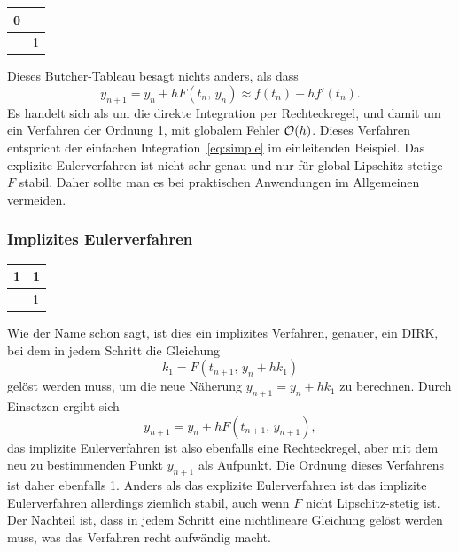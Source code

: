 \begin{center}
  \renewcommand{\arraystretch}{1.3}
  \begin{tabular}{r|l}
    0 & \\\hline
    & 1
  \end{tabular}
\end{center}
Dieses Butcher-Tableau besagt nichts anders, als dass
\begin{equation}
  y_{n+1} = y_n + h F(t_n,\, y_n) \approx f(t_n) + h f'(t_n).
\end{equation}
Es handelt sich als um die direkte Integration per Rechteckregel, und
damit um ein Verfahren der Ordnung 1, \dh mit globalem Fehler
$\mathcal O(h)$. Dieses Verfahren entspricht der einfachen
Integration~\eqref{eq:simple} im einleitenden Beispiel. Das explizite
Eulerverfahren ist nicht sehr genau und nur für global
Lipschitz-stetige $F$ stabil. Daher sollte man es bei praktischen
Anwendungen im Allgemeinen vermeiden.

\subsubsection{Implizites Eulerverfahren}

\begin{center}
  \renewcommand{\arraystretch}{1.3}
  \begin{tabular}{r|l}
    1 & 1\\\hline
    & 1
  \end{tabular}
\end{center}
Wie der Name schon sagt, ist dies ein implizites Verfahren, genauer,
ein DIRK, bei dem in jedem Schritt die Gleichung
\begin{equation}
  k_1 = F(t_{n+1},\,y_n + h k_1)
\end{equation}
gelöst werden muss, um die neue Näherung $y_{n+1} = y_n + h k_1$ zu
berechnen. Durch Einsetzen ergibt sich
\begin{equation}
  y_{n+1} = y_n + h F(t_{n+1},\, y_{n+1}),
\end{equation}
das implizite Eulerverfahren ist also ebenfalls eine Rechteckregel,
aber mit dem neu zu bestimmenden Punkt $y_{n+1}$ als Aufpunkt. Die
Ordnung dieses Verfahrens ist daher ebenfalls 1. Anders als das
explizite Eulerverfahren ist das implizite Eulerverfahren allerdings
ziemlich stabil, auch wenn $F$ nicht Lipschitz-stetig ist. Der
Nachteil ist, dass in jedem Schritt eine nichtlineare Gleichung gelöst
werden muss, was das Verfahren recht aufwändig macht.

